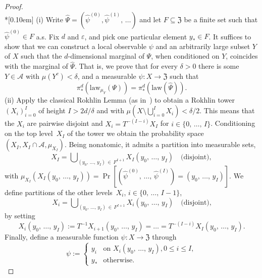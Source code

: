 \documentclass[10pt]{amsart}
\theoremstyle{definition}\newtheorem{defi}[theo]{Definition}\newtheorem{rema}[theo]{Remark}\newtheorem{exam}[theo]{Example}\newtheorem{exem}[theo]{Example}\newtheorem{nota}[theo]{Notation}
\newcommand{\clA}{\mathcal{A}}
\newcommand{\law}{\mathrm{law}}
\newcommand{\frkZ}{\mathfrak{Z}}
\begin{document}
\begin{proof}\ \\*[0.10em]
\noindent (i) Write $\widehat{\Psi}=(\widehat{\psi}^{(0)},\widehat{\psi} ^{(1)},\,\ldots)$ and let $F\subseteq\frkZ$ be a finite set such that $\widehat{\psi}^{(0)}\in F$ a.s. Fix $d$ and $\varepsilon$, and pick one particular element $y_{\ast}\in F$. It suffices to show that we can construct a local observable $\psi$ and an arbitrarily large subset $Y$ of $X$ such that the $d$-dimensional marginal of $\Psi$, when conditioned on $Y$, coincides with the marginal of $\widehat{\Psi}$. That is, we prove that for every $\delta>0$ there is some $Y\in\clA$ with $\mu(Y^{c})<\delta$, and a measurable $\psi:X\rightarrow\frkZ$ such that
\begin{equation} \label{Eq_awsawasa}
\pi_{\ast}^{d}\left(\law_{\mu_{Y}}(\Psi)\right)=\pi_{\ast}^{d}\left(\law \left(\widehat{\Psi}\right)\right).
\end{equation}
(ii) Apply the classical Rokhlin Lemma (as in~\cite[Lemma~7.4]{Z11}) to obtain a Rokhlin tower $(X_{i})_{i=0}^{I}$ of height $I>2d/\delta$ and with $\mu(X\setminus {\textstyle\bigcup\nolimits_{i=0}^{I}} X_{i})<\delta/2$. This means that the $X_{i}$ are pairwise disjoint and $X_{i}=T^{-(I-i)}X_{I}$ for $i\in\{0,\,\ldots,\,I\}$. Conditioning on the top level~$X_{I}$ of the tower we obtain the probability space $(X_{I},X_{I}
\cap\clA,\mu_{X_{I}})$. Being nonatomic, it admits a partition into measurable sets,
\[
X_{I}= {\textstyle\bigcup\nolimits_{\left(y_{0},\,\ldots,\,y_{I}\right)\,\in\,F^{I+1}}} X_{I}\left(y_{0},\,\ldots,\,y_{I}\right)\quad\text{(disjoint)},
\]
with $\mu_{X_{I}}(X_{I}(y_{0},\,\ldots,\,y_{I}))=\Pr[(\widehat{\psi}^{(0)},\,\ldots,\,\widehat{\psi}^{(I)})=(y_{0},\,\ldots,\,y_{I})]$. We define partitions of the other levels~$X_{i}$, $i\in\{0,\,\ldots,\,I-1\}$,
\[
X_{i}= {\textstyle\bigcup\nolimits_{\left(y_{0},\,\ldots,\,y_{I}\right)\,\in\,F^{I+1}}} X_{i}(y_{0},\,\ldots,\,y_{I})\quad\text{(disjoint),}
\]
by setting 
\[
X_{i}\left(y_{0},\,\ldots,\,y_{I}\right):=T^{-1}X_{i+1}\left(y_{0},\,\ldots,\,y_{I}\right)=\ldots=T^{-(I-i)}X_{I}\left(y_{0},\,\ldots,\,y_{I}\right).
\]
Finally, define a measurable function $\psi:X\rightarrow\frkZ$ through
\begin{equation}
\psi:=
\begin{cases}
y_{i} &\text{on }X_{i}\left(y_{0},\,\ldots,\,y_{I}\right), 0\leq i\leq I,\\
y_{\ast} &\text{otherwise}.
\end{cases}
\end{equation}

\end{proof}
\end{document}
